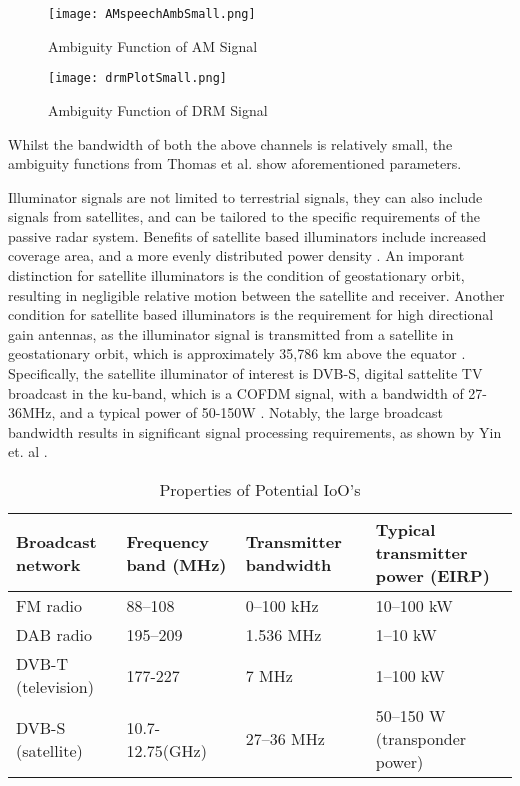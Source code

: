 \begin{figure}[htbp]
    \centering
    \texttt{[image: AMspeechAmbSmall.png]}
    \caption{Ambiguity Function of AM Signal \cite{AmbiguityCompare}}
    \label{fig:ambiguityAM}
\end{figure}

\begin{figure}[htbp]
    \centering
    \texttt{[image: drmPlotSmall.png]}
    \caption{Ambiguity Function of DRM Signal \cite{AmbiguityCompare}}
    \label{fig:ambiguityDRM}
\end{figure}

Whilst the bandwidth of both the above channels is relatively small, the ambiguity functions from Thomas et al. \cite{AmbiguityCompare} show aforementioned parameters.
  
\par \vspace{0.5cm} 
Illuminator signals are not limited to terrestrial signals, they can also include signals from satellites, and can be tailored to the specific requirements of the passive radar system. Benefits of satellite based illuminators include increased coverage area, and a more evenly distributed power density \cite{satelliteIlluminator}. An imporant distinction for satellite illuminators is the condition of geostationary orbit, resulting in negligible relative motion between the satellite and receiver. Another condition for satellite based illuminators is the requirement for high directional gain antennas, as the illuminator signal is transmitted from a satellite in geostationary orbit, which is approximately 35,786 km above the equator \cite{satelliteIlluminator}. Specifically, the satellite illuminator of interest is DVB-S, digital sattelite TV broadcast in the ku-band, which is a COFDM signal, with a bandwidth of 27-36MHz, and a typical power of 50-150W \cite{DVB-S}. Notably, the large broadcast bandwidth results in significant signal processing requirements, as shown by Yin et. al \cite{DVBnoise}.


\par \vspace{0.5cm}
\begin{table}[!ht]
    \centering
    \caption{Properties of Potential IoO's}
    \label{tab:rf_spectrum_management}
    \begin{tabular}{|p{3cm}|p{3cm}|p{3cm}|p{4cm}|}
        \hline
        \textbf{Broadcast network} & \textbf{Frequency band (MHz)} & \textbf{Transmitter bandwidth} & \textbf{Typical transmitter power (EIRP)} \\ \hline
        FM radio & 88–108 & 0–100 kHz & 10–100 kW \\ \hline
        DAB radio & 195–209 & 1.536 MHz & 1–10 kW \\ \hline
        DVB-T (television) & 177-227 & 7 MHz & 1–100 kW \\ \hline
        DVB-S (satellite) & 10.7-12.75(GHz) & 27–36 MHz & 50–150 W (transponder power) \\ \hline
    \end{tabular}
\end{table}


